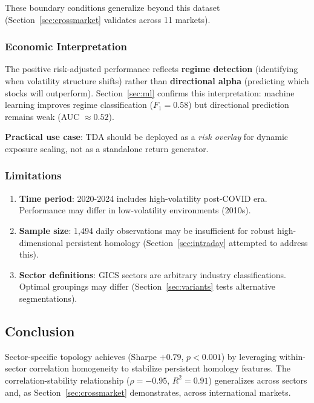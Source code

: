These boundary conditions generalize beyond this dataset (Section~\ref{sec:crossmarket} validates across 11 markets).

\subsubsection{Economic Interpretation}

The positive risk-adjusted performance reflects \textbf{regime detection} (identifying when volatility structure shifts) rather than \textbf{directional alpha} (predicting which stocks will outperform). Section~\ref{sec:ml} confirms this interpretation: machine learning improves regime classification ($F_1 = 0.58$) but directional prediction remains weak (AUC $\approx 0.52$).

\textbf{Practical use case}: TDA should be deployed as a \textit{risk overlay} for dynamic exposure scaling, not as a standalone return generator.

\subsubsection{Limitations}

\begin{enumerate}
    \item \textbf{Time period}: 2020-2024 includes high-volatility post-COVID era. Performance may differ in low-volatility environments (2010s).
    \item \textbf{Sample size}: 1,494 daily observations may be insufficient for robust high-dimensional persistent homology (Section~\ref{sec:intraday} attempted to address this).
    \item \textbf{Sector definitions}: GICS sectors are arbitrary industry classifications. Optimal groupings may differ (Section~\ref{sec:variants} tests alternative segmentations).
\end{enumerate}

\subsection{Conclusion}

Sector-specific topology achieves \positiverisk{} (Sharpe $+0.79$, $p < 0.001$) by leveraging within-sector correlation homogeneity to stabilize persistent homology features. The correlation-stability relationship ($\rho = -0.95$, $R^2 = 0.91$) generalizes across sectors and, as Section~\ref{sec:crossmarket} demonstrates, across international markets.

